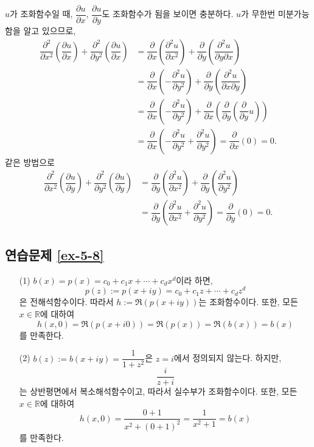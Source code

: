 $u$가 조화함수일 때, $\dfrac{\partial u}{\partial x}$, $\dfrac{\partial u}{\partial y}$도
조화함수가 됨을 보이면 충분하다.
$u$가 무한번 미분가능함을 알고 있으므로,
\begin{align*}
\dfrac{\partial^2}{\partial x^2}\left(\dfrac{\partial u}{\partial x}\right) 
+ \dfrac{\partial^2}{\partial y^2}\left(\dfrac{\partial u}{\partial x}\right) 
&= \dfrac{\partial}{\partial x}\left(\dfrac{\partial^2 u}{\partial x^2}\right) 
+ \dfrac{\partial}{\partial y}\left(\dfrac{\partial^2 u}{\partial y\partial x}\right)  \\
&= \dfrac{\partial}{\partial x}\left(-\dfrac{\partial^2 u}{\partial y^2}\right) 
+ \dfrac{\partial}{\partial y}\left(\dfrac{\partial^2 u}{\partial x\partial y}\right)  \\
&= \dfrac{\partial}{\partial x}\left(-\dfrac{\partial^2 u}{\partial y^2}\right) 
+ \dfrac{\partial}{\partial x}\left(\dfrac{\partial}{\partial y}
\left(\dfrac{\partial}{\partial y}u \right)\right)  \\
&= \dfrac{\partial}{\partial x}\left(-\dfrac{\partial^2 u}{\partial y^2}
+\dfrac{\partial^2 u}{\partial y^2} \right) 
= \dfrac{\partial}{\partial x}(0) = 0.
\end{align*}
같은 방법으로
\begin{align*}
\dfrac{\partial^2}{\partial x^2}\left(\dfrac{\partial u}{\partial y}\right) 
+ \dfrac{\partial^2}{\partial y^2}\left(\dfrac{\partial u}{\partial y}\right)  
&= \dfrac{\partial}{\partial y}\left(\dfrac{\partial^2 u}{\partial x^2}\right) 
+ \dfrac{\partial}{\partial y}\left(\dfrac{\partial^2 u}{\partial y^2}\right)  \\
&= \dfrac{\partial}{\partial y} \left(
\dfrac{\partial^2 u}{\partial x^2} + \dfrac{\partial^2 u}{\partial y^2} \right)
= \dfrac\partial{\partial y}(0) = 0.
\end{align*}

\subsection*{연습문제 \ref{ex-5-8}}

\begin{itemize}
\item[(1)]  $b(x) = p(x) = c_0 + c_1 x + \cdots + c_d x^d$이라 하면,
\[
p(z) := p(x+iy) = c_0 + c_1 z + \cdots + c_d z^d
\]
은 전해석함수이다. 따라서 $h:= \Re(p(x+iy))$는 조화함수이다.
또한, 모든 $x\in\mathbb R$에 대하여
\[
h(x,0) = \Re(p(x+i0)) =\Re(p(x)) = \Re(b(x)) = b(x)
\]
를 만족한다.

\item[(2)]  $b(z):= b(x+iy) = \dfrac1{1+z^2}$은 $z=i$에서 정의되지 않는다.
하지만,
\[
\dfrac{i}{z+i}
\]
는 상반평면에서 복소해석함수이고, 따라서 실수부가 조화함수이다.
또한, 모든 $x\in\mathbb R$에 대하여
\[
h(x,0) = \dfrac{0+1}{x^2+(0+1)^2} = \dfrac1{x^2+1} = b(x)
\]
를 만족한다.
\end{itemize}

